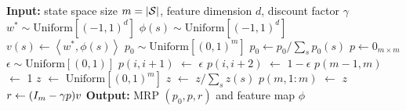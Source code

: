 \documentclass{article}
\newcommand{\fS}{\mathcal{S}}
\newcommand{\R}{\mathbb{R}}
\newcommand{\indot}[2]{{\left<#1, #2\right>}}
\newcommand{\uniform}[1]{{\text{Uniform}\left[#1\right]}}
\begin{document}


\begin{algorithm}[h]
    \caption{Boyan Chain MRP and Feature Generation (Representable)} \label{alg:boyan generation representable}
    \begin{algorithmic}[1]
    \STATE \textbf{Input:} state space size $m = \abs{\fS}$, feature dimension $d$, discount factor $\gamma$
    \STATE $w^* \sim \uniform{(-1, 1)^d}$ 
    \FOR{$s \in \fS$}
    \STATE $\phi(s) \sim \uniform{(-1, 1)^d}$ 
    \STATE $v(s) \gets \indot{w^*}{\phi(s)}$ 
    \ENDFOR
    \STATE $p_0 \sim \uniform{(0, 1)^m}$ 
    \STATE $p_0 \gets p_0 /\sum_s p_0(s)$
    \STATE $p \gets 0_{m \times m}$ 
        \STATE $\epsilon \sim \uniform{(0, 1)}$
        \STATE $p(i, i+1)$ $\gets$ $\epsilon$
        \STATE $p(i, i+2)$ $\gets$ $1 - \epsilon$
    \ENDFOR
    \STATE $p(m-1, m)$ $\gets$ 1
    \STATE $z$ $\gets$ $\uniform{(0, 1)^m}$
    \STATE $z$ $\gets$ $z/\sum_s z(s)$
    \STATE $p(m, 1:m)$ $\gets$ $z$
    \STATE $r \gets \qty(I_m - \gamma p)v$ 
    \STATE \textbf{Output:} MRP $(p_0, p, r)$ and feature map $\phi$
    \end{algorithmic}
\end{algorithm}
\end{document}
